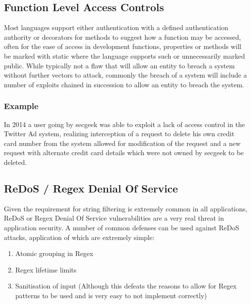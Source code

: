 \documentclass{IEEEtran}
\begin{document}
        \subsection{Function Level Access Controls}
            Most languages support either authentication with a defined authentication authority or decorators 
            for methods to suggest how a function may be accessed, often for the ease of access in development 
            functions, properties or methods will be marked with static where the language supports such or 
            unnecessarily marked public. While typically not a flaw that will allow an entity to breach a system without 
            further vectors to attack, commonly the breach of a system will include a number of exploits chained 
            in succession to allow an entity to breach the system.
            \medskip
            \\
            \subsubsection{Example}
                In 2014 a user going by secgeek\cite{secgeek} was able to exploit a lack of access control in the 
                Twitter Ad system, realizing interception of a request to delete his own credit card number from 
                the system allowed for modification of the request and a new request with alternate credit 
                card details which were not owned by secgeek to be deleted.

        \newpage
        \onecolumn
        \subsection{ReDoS / Regex Denial Of Service}
            Given the requirement for string filtering is extremely common in all applications,
            ReDoS or Regex Denial Of Service\cite{ReDoS} vulnerabilities are a very real threat in application security.
            A number of common defenses can be used against ReDoS attacks, application of 
            which are extremely simple:
            \begin{enumerate}
                \item Atomic grouping in Regex
                \item Regex lifetime limits
                \item Sanitisation of input (Although this defeats the reasons to allow for
                Regex patterns to be used and is very easy to not implement correctly)
            \end{enumerate}
\end{document}
